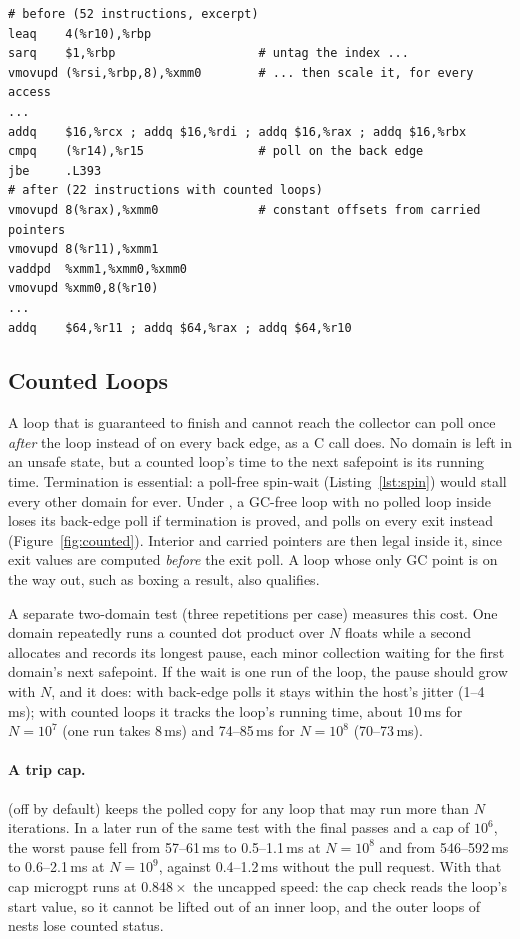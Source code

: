 \begin{lstlisting}[language=asmX,caption={nx-oxcaml \texttt{add\_float64}, 8-wide SIMD loop, before (24 lea/sar pairs, back-edge poll) and after (one carried pointer per array).},label=lst:nx-simd]
# before (52 instructions, excerpt)
leaq    4(%r10),%rbp
sarq    $1,%rbp                    # untag the index ...
vmovupd (%rsi,%rbp,8),%xmm0        # ... then scale it, for every access
...
addq    $16,%rcx ; addq $16,%rdi ; addq $16,%rax ; addq $16,%rbx
cmpq    (%r14),%r15                # poll on the back edge
jbe     .L393
# after (22 instructions with counted loops)
vmovupd 8(%rax),%xmm0              # constant offsets from carried pointers
vmovupd 8(%r11),%xmm1
vaddpd  %xmm1,%xmm0,%xmm0
vmovupd %xmm0,8(%r10)
...
addq    $64,%r11 ; addq $64,%rax ; addq $64,%r10
\end{lstlisting}

\subsection{Counted Loops}
A loop that is guaranteed to finish and cannot reach the collector can poll
once \emph{after} the loop instead of on every back edge, as a
\code{[@@noalloc]} C call does. No domain is left in an unsafe state, but a
counted loop's time to the next safepoint is its running time. Termination is
essential: a poll-free spin-wait (Listing~\ref{lst:spin}) would stall every
other domain for ever. Under
, a GC-free loop with no polled loop inside loses its
back-edge poll if termination is proved, and polls on every exit instead
(Figure~\ref{fig:counted}). Interior and carried pointers are then legal
inside it, since exit values are computed \emph{before} the exit poll. A loop
whose only GC point is on the way out, such as boxing a result, also
qualifies.

A separate two-domain test (three repetitions per case) measures this cost.
One domain repeatedly runs a counted dot product over $N$ floats while a
second allocates and records its longest pause, each minor collection waiting
for the first domain's next safepoint. If the wait is one run of the loop,
the pause should grow with $N$, and it does: with back-edge
polls it stays within the host's jitter (1--4\,ms); with counted loops it
tracks the loop's running time, about 10\,ms for $N = 10^7$ (one run takes
8\,ms) and 74--85\,ms for $N = 10^8$ (70--73\,ms).

\paragraph{A trip cap.}  (off by
default) keeps the polled copy for any loop that may run more than $N$
iterations. In a later run of the same test with the final passes and a cap
of $10^6$, the worst pause fell from 57--61\,ms to 0.5--1.1\,ms at $N = 10^8$
and from 546--592\,ms to 0.6--2.1\,ms at $N = 10^9$, against 0.4--1.2\,ms
without the pull request. With that cap microgpt runs at $0.848\times$ the
uncapped speed: the cap check reads the loop's start value, so it cannot be
lifted out of an inner loop, and the outer loops of nests lose counted status.

